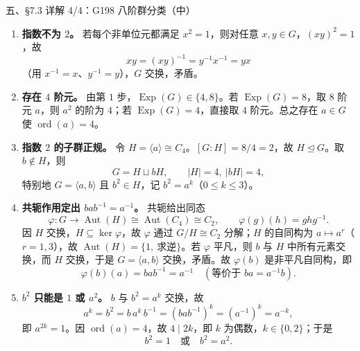 \documentclass[aspectratio=169,10pt,fontset=none]{ctexbeamer}
\newcommand{\key}[1]{\textcolor{ink}{\bfseries #1}}
\begin{document}
\begin{frame}[t]{五、\S7.3 详解 4/4：G198 八阶群分类（中）}
\leavevmode{\footnotesize\key{详解 2：非交换情形存在 $4$ 阶元}\ \ 设 $G$ 非交换，$|G|=8$。\par}
\begin{enumerate}\setlength{\itemsep}{1pt}
\scriptsize
\item \textbf{指数不为 $2$。} 若每个非单位元都满足 $x^2=1$，则对任意 $x,y\in G$，$(xy)^2=1$，故
\[ xy=(xy)^{-1}=y^{-1}x^{-1}=yx \]
（用 $x^{-1}=x$、$y^{-1}=y$），$G$ 交换，矛盾。
\item \textbf{存在 $4$ 阶元。} 由第 $1$ 步，$\operatorname{Exp}(G)\in\{4,8\}$。若 $\operatorname{Exp}(G)=8$，取 $8$ 阶元 $a$，则 $a^2$ 的阶为 $4$；若 $\operatorname{Exp}(G)=4$，直接取 $4$ 阶元。总之存在 $a\in G$ 使 $\operatorname{ord}(a)=4$。
\item \textbf{指数 $2$ 的子群正规。} 令 $H=\langle a\rangle\cong C_4$。$[G:H]=8/4=2$，故 $H\trianglelefteq G$。取 $b\notin H$，则
\[ G=H\sqcup bH,\qquad |H|=4,\ |bH|=4, \]
特别地 $G=\langle a,b\rangle$ 且 $b^2\in H$，记 $b^2=a^k$（$0\le k\le3$）。
\item \textbf{共轭作用定出 $bab^{-1}=a^{-1}$。} 共轭给出同态
\[ \varphi:G\to\operatorname{Aut}(H)\cong\operatorname{Aut}(C_4)\cong C_2,\qquad \varphi(g)(h)=ghg^{-1}. \]
因 $H$ 交换，$H\subseteq\ker\varphi$，故 $\varphi$ 通过 $G/H\cong C_2$ 分解；$H$ 的自同构为 $a\mapsto a^r$（$r=1,3$），故 $\operatorname{Aut}(H)=\{1,\ \text{求逆}\}$。若 $\varphi$ 平凡，则 $b$ 与 $H$ 中所有元素交换，而 $H$ 交换，于是 $G=\langle a,b\rangle$ 交换，矛盾。故 $\varphi(b)$ 是非平凡自同构，即
\[ \varphi(b)(a)=bab^{-1}=a^{-1}\quad\left(\text{等价于 }ba=a^{-1}b\right). \]
\item \textbf{$b^2$ 只能是 $1$ 或 $a^2$。} $b$ 与 $b^2=a^k$ 交换，故
\[ a^k=b^2=b\,a^k\,b^{-1}=(bab^{-1})^k=(a^{-1})^k=a^{-k}, \]
即 $a^{2k}=1$。因 $\operatorname{ord}(a)=4$，故 $4\mid 2k$，即 $k$ 为偶数，$k\in\{0,2\}$；于是
\[ b^2=1\quad\text{或}\quad b^2=a^2. \]
\end{enumerate}
\end{frame}
\end{document}
